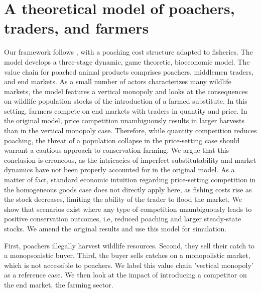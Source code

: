 \section{A theoretical model of poachers, traders, and farmers}

Our framework follows \cite{damania_economics_2007}, with a poaching cost structure adapted to fisheries. The model develops a three-stage dynamic, game theoretic, bioeconomic model. The value chain for poached animal products comprises poachers, middlemen traders, and end markets. As a small number of actors characterizes many wildlife markets, the model features a vertical monopoly and looks at the consequences on wildlife population stocks of the introduction of a farmed substitute. In this setting, farmers compete on end markets with traders in quantity and price. In the original model, price competition unambiguously results in larger harvests than in the vertical monopoly case. Therefore, while quantity competition reduces poaching, the threat of a population collapse in the price-setting case should warrant a cautious approach to conservation farming. We argue that this conclusion is erroneous, as the intricacies of imperfect substitutability and market dynamics have not been properly accounted for in the original model. As a matter of fact, standard economic intuition regarding price-setting competition in the homogeneous goods case does not directly apply here, as fishing costs rise as the stock decreases, limiting the ability of the trader to flood the market. We show that scenarios exist where any type of competition unambiguously leads to positive conservation outcomes, i.e, reduced poaching and larger steady-state stocks. We amend the original results and use this model for simulation. 

First, poachers illegally harvest wildlife resources. Second, they sell their catch to a monopsonistic buyer. Third, the buyer sells catches on a monopolistic market, which is not accessible to poachers. We label this value chain 'vertical monopoly' as a reference case. We then look at the impact of introducing a competitor on the end market, the farming sector. 


